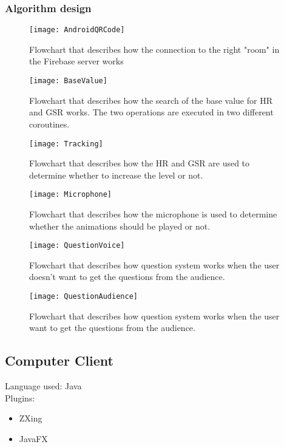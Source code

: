 \subsubsection{Algorithm design}
\begin{figure}[H]
	\centering
	\texttt{[image: AndroidQRCode]}
	\caption{Flowchart that describes how the connection to the right "room" in the Firebase server works}
\end{figure}

\begin{figure}[H]
	\centering
	\texttt{[image: BaseValue]}
	\caption{Flowchart that describes how the search of the base value for HR and GSR works. The two operations are executed in two different coroutines.}
\end{figure}

\begin{figure}[H]
	\centering
	\texttt{[image: Tracking]}
	\caption{Flowchart that describes how the HR and GSR are used to determine whether to increase the level or not.}
\end{figure}

\begin{figure}[H]
	\centering
	\texttt{[image: Microphone]}
	\caption{Flowchart that describes how the microphone is used to determine whether the animations should be played or not.}
\end{figure}

\begin{figure}[H]
	\centering
	\texttt{[image: QuestionVoice]}
	\caption{Flowchart that describes how question system works when the user doesn't want to get the questions from the audience.}
\end{figure}

\begin{figure}[H]
	\centering
	\texttt{[image: QuestionAudience]}
	\caption{Flowchart that describes how question system works when the user want to get the questions from the audience.}
\end{figure}

\subsection{Computer Client}
Language used: Java\\
Plugins:
\begin{itemize}
	\item ZXing
	\item JavaFX
\end{itemize}

